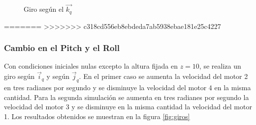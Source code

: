 \documentclass[main]{subfiles}
\begin{document}
\begin{figure} [h!]
  \centering
  \caption{Giro seg\'un el $\vec{k_q}$}
  \label{fig:hov}
\end{figure}

=======
>>>>>>> c318cd556eb8ebdeda7ab5938ebae181e25c4227

\subsubsection*{Cambio en el Pitch y el Roll}
Con condiciones iniciales nulas excepto la altura fijada en $z=10$, se realiza un giro seg\'un $\vec{i}_q$ y seg\'un $\vec{j}_q$. En el primer caso se aumenta la velocidad del motor 2 en tres radianes por segundo y se disminuye la velocidad del motor 4 en la misma cantidad. Para la segunda simulaci\'on se aumenta en tres radianes por segundo la velocidad del motor 3 y se disminuye en la misma cantidad la velocidad del motor 1. Los resultados obtenidos se muestran en la figura \ref{fig:giros}
\end{document}
